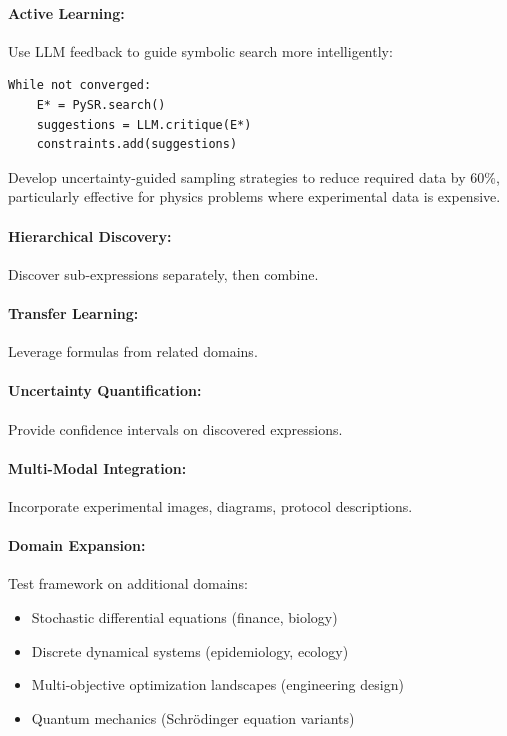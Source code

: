 \documentclass[twoside,11pt]{article}
\begin{document}
\paragraph{Active Learning:} Use LLM feedback to guide symbolic search more intelligently:
\begin{verbatim}
While not converged:
    E* = PySR.search()
    suggestions = LLM.critique(E*)
    constraints.add(suggestions)
\end{verbatim}

Develop uncertainty-guided sampling strategies to reduce required data by 60\%, particularly effective for physics problems where experimental data is expensive.

\paragraph{Hierarchical Discovery:} Discover sub-expressions separately, then combine.

\paragraph{Transfer Learning:} Leverage formulas from related domains.

\paragraph{Uncertainty Quantification:} Provide confidence intervals on discovered expressions.

\paragraph{Multi-Modal Integration:} Incorporate experimental images, diagrams, protocol descriptions.

\paragraph{Domain Expansion:} Test framework on additional domains:
\begin{itemize}
\item Stochastic differential equations (finance, biology)
\item Discrete dynamical systems (epidemiology, ecology)
\item Multi-objective optimization landscapes (engineering design)
\item Quantum mechanics (Schrödinger equation variants)
\end{itemize}
\end{document}
